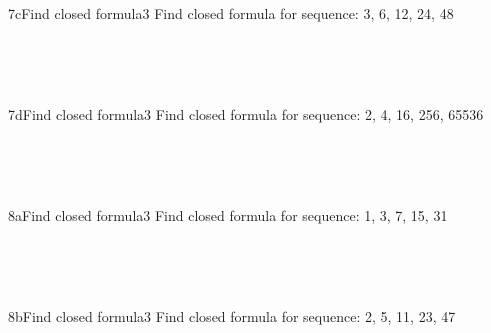 \documentclass[a4paper,12pt]{book}
\begin{document}
    ~\\
    
    \hrulefill
    
    ~\\
    \begin{answersheetquestion}{7c}{Find closed formula}{3}
        Find closed formula for sequence: 3, 6, 12, 24, 48
        \iftoggle{answerkey}{ \begin{answer} $a_{n} = 2 \cdot a_{n-1}$ \end{answer} }{ { ~\\ \raisebox{0pt}[2cm][0pt]{  } } }
    \end{answersheetquestion}

    ~\\
    
    \hrulefill
    
    ~\\
    \begin{answersheetquestion}{7d}{Find closed formula}{3}
        Find closed formula for sequence: 2, 4, 16, 256, 65536
        \iftoggle{answerkey}{ \begin{answer} $a_{n} = (a_{n-1})^{2}$ \end{answer} }{ { ~\\ \raisebox{0pt}[2cm][0pt]{  } } }
    \end{answersheetquestion}

    ~\\
    
    \hrulefill
    
    ~\\
    \begin{answersheetquestion}{8a}{Find closed formula}{3}
        Find closed formula for sequence: 1, 3, 7, 15, 31
        \iftoggle{answerkey}{ \begin{answer} $a_{n} = 2 \cdot a_{n-1} + 1$ \end{answer} }{ { ~\\ \raisebox{0pt}[2cm][0pt]{  } } }
    \end{answersheetquestion}

    ~\\
    
    \hrulefill
    
    ~\\
    \begin{answersheetquestion}{8b}{Find closed formula}{3}
        Find closed formula for sequence: 2, 5, 11, 23, 47
        \iftoggle{answerkey}{ \begin{answer} $a_{n} = 2 \cdot a_{n-1} + 1$ \end{answer} }{ { ~\\ \raisebox{0pt}[2cm][0pt]{  } } }
    \end{answersheetquestion}
\end{document}
